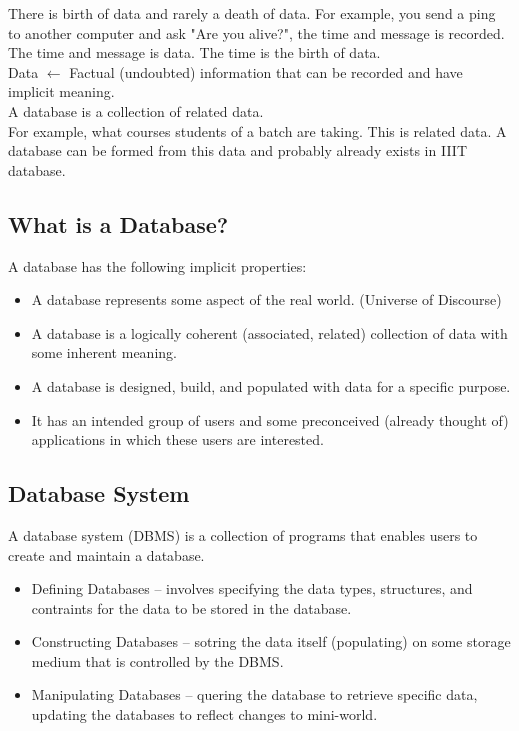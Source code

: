 There is birth of data and rarely a death of data.
For example, you send a ping to another computer and ask "Are you alive?", the time and message is recorded. The time and message is data. The time is the birth of data.\\

Data $\leftarrow$ Factual (undoubted) information that can be
recorded and have implicit meaning. \\

A database is a collection of related data. \\

For example, what courses students of a batch are taking.
This is related data. A database can be formed from this data and
probably already exists in IIIT database.\\

\subsection{What is a Database?}

A database has the following implicit properties:

\begin{itemize}
\item A database represents some aspect of the real world. (Universe of Discourse)
\item A database is a logically coherent (associated, related) collection of data with some inherent meaning.
\item A database is designed, build, and populated with data for a specific purpose.
\item It has an intended group of users and some preconceived (already thought of) applications in which these users are interested.
\end{itemize}

\subsection{Database System}
A database system (DBMS) is a collection of programs that enables
users to create and maintain a database.

\begin{itemize}
\item Defining Databases -- involves specifying the data types,
    structures, and contraints for the data to be stored in the
    database.
\item Constructing Databases -- sotring the data itself (populating)
    on some storage medium that is controlled by the DBMS.
\item Manipulating Databases -- quering the database to retrieve specific data, updating the databases to reflect changes to mini-world.
\end{itemize}

